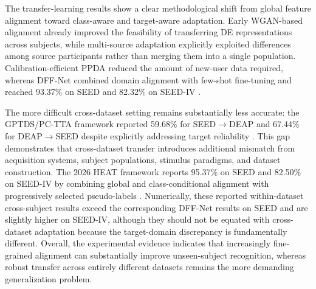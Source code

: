 \documentclass{WileyMSP-template}
\begin{document}
The transfer-learning results show a clear methodological shift from global feature alignment toward class-aware and target-aware adaptation. Early WGAN-based alignment already improved the feasibility of transferring DE representations across subjects, while multi-source adaptation explicitly exploited differences among source participants rather than merging them into a single population. Calibration-efficient PPDA reduced the amount of new-user data required, whereas DFF-Net combined domain alignment with few-shot fine-tuning and reached 93.37\% on SEED and 82.32\% on SEED-IV \cite{lu2023frontiers_dffnet}.

The more difficult cross-dataset setting remains substantially less accurate: the GPTDS/PC-TTA framework reported 59.68\% for SEED$\rightarrow$DEAP and 67.44\% for DEAP$\rightarrow$SEED despite explicitly addressing target reliability \cite{imtiaz2025compbiomed_uda_gptds}. This gap demonstrates that cross-dataset transfer introduces additional mismatch from acquisition systems, subject populations, stimulus paradigms, and dataset construction. The 2026 HEAT framework reports 95.37\% on SEED and 82.50\% on SEED-IV by combining global and class-conditional alignment with progressively selected pseudo-labels \cite{hong2026heat}. Numerically, these reported within-dataset cross-subject results exceed the corresponding DFF-Net results on SEED and are slightly higher on SEED-IV, although they should not be equated with cross-dataset adaptation because the target-domain discrepancy is fundamentally different. Overall, the experimental evidence indicates that increasingly fine-grained alignment can substantially improve unseen-subject recognition, whereas robust transfer across entirely different datasets remains the more demanding generalization problem.



\end{document}
